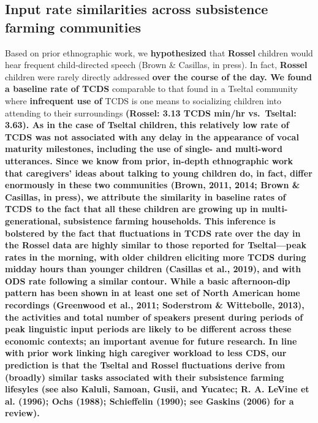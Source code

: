 \documentclass[,man,floatsintext]{apa6}
\begin{document}
\subsection{\texorpdfstring{\textbf{Input rate similarities across
subsistence farming
communities}}{Input rate similarities across subsistence farming communities}}\label{input-rate-similarities-across-subsistence-farming-communities}

Based on prior ethnographic work, we \textbf{hypothesized} that
\textbf{Rossel} children would hear frequent child-directed speech
(Brown \& Casillas, in press). In fact, \textbf{Rossel} children were
rarely directly addressed \textbf{over the course of the day. We found a
baseline rate of TCDS} comparable to that found in a Tseltal community
where \textbf{infrequent use of} TCDS is one means to socializing
children into attending to their surroundings \textbf{(Rossel: 3.13 TCDS
min/hr vs.~Tseltal: 3.63). As in the case of Tseltal children, this
relatively low rate of TCDS was not associated with any delay in the
appearance of vocal maturity milestones, including the use of single-
and multi-word utterances. Since we know from prior, in-depth
ethnographic work that caregivers' ideas about talking to young children
do, in fact, differ enormously in these two communities (Brown, 2011,
2014; Brown \& Casillas, in press), we attribute the similarity in
baseline rates of TCDS to the fact that all these children are growing
up in multi-generational, subsistence farming households. This inference
is bolstered by the fact that fluctuations in TCDS rate over the day in
the Rossel data are highly similar to those reported for Tseltal---peak
rates in the morning, with older children eliciting more TCDS during
midday hours than younger children (Casillas et al., 2019), and with ODS
rate following a similar contour. While a basic afternoon-dip pattern
has been shown in at least one set of North American home recordings
(Greenwood et al., 2011; Soderstrom \& Wittebolle, 2013), the activities
and total number of speakers present during periods of peak linguistic
input periods are likely to be different across these economic contexts;
an important avenue for future research. In line with prior work linking
high caregiver workload to less CDS, our prediction is that the Tseltal
and Rossel fluctuations derive from (broadly) similar tasks associated
with their subsistence farming lifesyles (see also Kaluli, Samoan,
Gusii, and Yucatec; R. A. LeVine et al. (1996); Ochs (1988); Schieffelin
(1990); see Gaskins (2006) for a review).}
\end{document}
